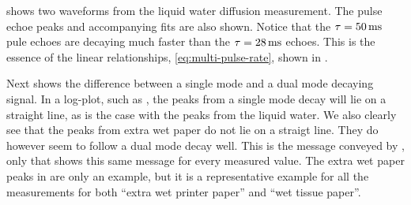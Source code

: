 \documentclass[11pt,a4paper, twocolumn,
swedish, english %
]{article}
\begin{document}
 shows two waveforms from the liquid water
diffusion measurement. The pulse echoe peaks and accompanying fits are
also shown. Notice that the $\tau=\unit[50]{ms}$ pule echoes are
decaying much faster than the $\tau=\unit[28]{ms}$ echoes. This is the
essence of the linear relationships, \eqref{eq:multi-pulse-rate},
shown in . 

Next  shows the difference between a single
mode and a dual mode decaying signal. In a log-plot, such as
, the peaks from a single mode decay will lie
on a straight line, as is the case with the peaks from the liquid
water. We also clearly see that the peaks from extra wet paper
do not lie on a straigt line. They do however seem to follow a dual
mode decay well. This is the message conveyed by
, only that  shows this same
message for every measured value. The extra wet paper peaks in
 are only an example, but it is a
representative example for all the measurements for both ``extra wet
printer paper'' and ``wet tissue paper''.



\end{document}
